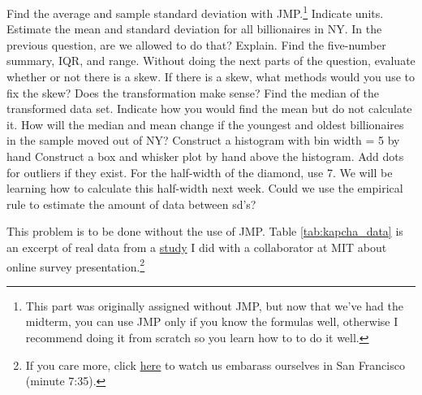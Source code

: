\documentclass[12pt]{article}
\begin{document}
\benum
\easysubproblem Find the average and sample standard deviation with JMP.\footnote{This part was originally assigned without JMP, but now that we've had the midterm, you can use JMP only if you know the formulas well, otherwise I recommend doing it from scratch so you learn how to to do it well.} Indicate units.
\easysubproblem Estimate the mean and standard deviation for all billionaires in NY.
\easysubproblem In the previous question, are we allowed to do that? Explain. 
\easysubproblem Find the five-number summary, IQR, and range.
\easysubproblem Without doing the next parts of the question, evaluate whether or not there is a skew.
\easysubproblem If there is a skew, what methods would you use to fix the skew? Does the transformation make sense?
\easysubproblem Find the median of the transformed data set. Indicate how you would find the mean but do not calculate it.
\easysubproblem How will the median and mean change if the youngest and oldest billionaires in the sample
moved out of NY?
\easysubproblem Construct a histogram with bin width = 5 by hand
\intermediatesubproblem Construct a box and whisker plot by hand above the histogram. Add dots for outliers if they exist. For the half-width of the diamond, use 7. We will be learning how to calculate this half-width next week.
\easysubproblem Could we use the empirical rule to estimate the amount of data between sd's?
\eenum

\problem This problem is to be done without the use of JMP. Table \ref{tab:kapcha_data} is an excerpt of real data from a \href{http://www.mendeley.com/download/public/876311/3709908162/db46ccaeedcab59e40e61cf50e72b6b4d5b8dcdd/dl.pdf}{study} I did with a collaborator at MIT about online survey presentation.\footnote{If you care more, click \href{http://www.crowdconf2010.com/fundamental.html}{here} to watch us embarass ourselves in San Francisco (minute 7:35).}
\end{document}

